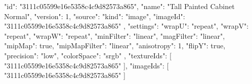 {
  "id": "3111c05599e16e5358c4c9d82573a865",
  "name": "Tall Painted Cabinet Normal",
  "version": 1,
  "source": {
    "kind": "image",
    "imageId": "3111c05599e16e5358c4c9d82573a865"
  },
  "settings": {
    "wrapU": "repeat",
    "wrapV": "repeat",
    "wrapW": "repeat",
    "minFilter": "linear",
    "magFilter": "linear",
    "mipMap": true,
    "mipMapFilter": "linear",
    "anisotropy": 1,
    "flipY": true,
    "precision": "low",
    "colorSpace": "srgb"
  },
  "textureIds": [
    "3111c05599e16e5358c4c9d82573a865"
  ],
  "imageIds": [
    "3111c05599e16e5358c4c9d82573a865"
  ]
}
